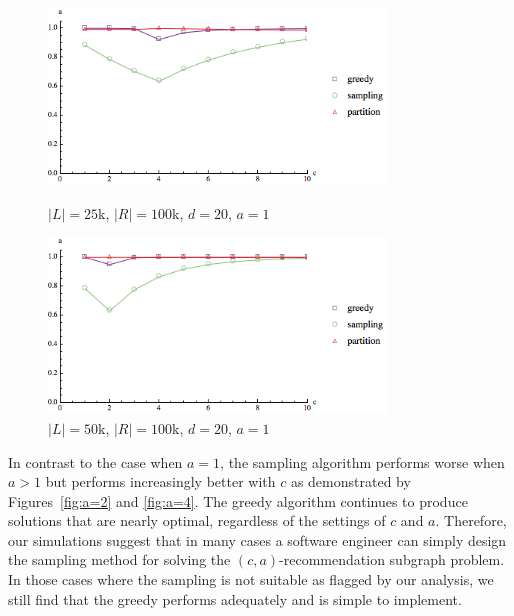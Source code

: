 \begin{figure}[t]
\centering
\begin{minipage}[h]{0.48\textwidth}
\centering
\includegraphics[width=0.8\textwidth]{images/l=25000,r=100000_Greedy_vs_Naive.png}
\caption{$|L|=25$k, $|R|=100$k, $d=20$, $a=1$}\label{fig:a=1:1}
\end{minipage}
\hspace{0cm}
\begin{minipage}[h]{0.48\textwidth}
\centering
\includegraphics[width=0.8\textwidth]{images/l=50000,r=100000_Greedy_vs_Naive.png}
\caption{$|L|=50$k, $|R|=100$k, $d=20$, $a=1$}\label{fig:a=1:2}
\end{minipage}
\vspace{-0.2in}
\end{figure}


\vs
In contrast to the case when $a=1$, the sampling algorithm performs
worse when $a>1$ but performs increasingly better with $c$ as
demonstrated by Figures~\ref{fig:a=2} and \ref{fig:a=4}. The greedy
algorithm continues to produce solutions that are nearly optimal,
regardless of the settings of $c$ and $a$. Therefore, our simulations
suggest that in many cases a software engineer can simply design the
sampling method for solving the $(c, a)$-recommendation subgraph
problem. In those cases where the sampling is not suitable as flagged by our analysis, 
we still find that the greedy performs adequately and is simple to implement.


